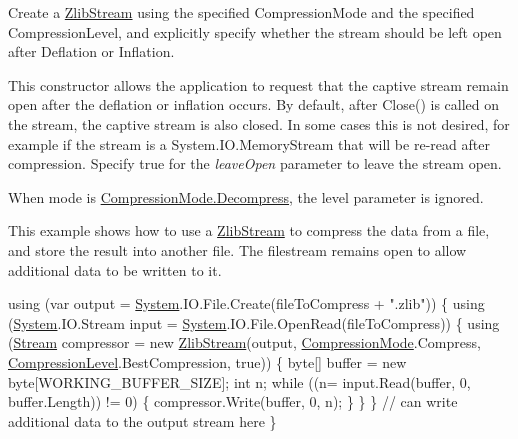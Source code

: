 Create a {\ttfamily \mbox{\hyperlink{class_super_tiled2_unity_1_1_ionic_1_1_zlib_1_1_zlib_stream}{Zlib\+Stream}}} using the specified {\ttfamily Compression\+Mode} and the specified {\ttfamily Compression\+Level}, and explicitly specify whether the stream should be left open after Deflation or Inflation. 

This constructor allows the application to request that the captive stream remain open after the deflation or inflation occurs. By default, after {\ttfamily Close()} is called on the stream, the captive stream is also closed. In some cases this is not desired, for example if the stream is a System.\+I\+O.\+Memory\+Stream that will be re-\/read after compression. Specify true for the {\itshape leave\+Open}  parameter to leave the stream open. 

When mode is {\ttfamily \mbox{\hyperlink{namespace_super_tiled2_unity_1_1_ionic_1_1_zlib_ad5b7635d92497e1c905e5de82eb1c6b1a6d2861192fdf4370bcf95c099be0f2f0}{Compression\+Mode.\+Decompress}}}, the level parameter is ignored. 

This example shows how to use a \mbox{\hyperlink{class_super_tiled2_unity_1_1_ionic_1_1_zlib_1_1_zlib_stream}{Zlib\+Stream}} to compress the data from a file, and store the result into another file. The filestream remains open to allow additional data to be written to it.


\begin{DoxyCode}
\textcolor{keyword}{using} (var output = \mbox{\hyperlink{namespace_system}{System}}.IO.File.Create(fileToCompress + \textcolor{stringliteral}{".zlib"}))
\{
    \textcolor{keyword}{using} (\mbox{\hyperlink{namespace_system}{System}}.IO.Stream input = \mbox{\hyperlink{namespace_system}{System}}.IO.File.OpenRead(fileToCompress))
    \{
        \textcolor{keyword}{using} (\mbox{\hyperlink{namespace_super_tiled2_unity_1_1_ionic_1_1_zip_a9ced5352c56e7e0fceff15b534073c83aeae835e83c0494a376229f254f7d3392}{Stream}} compressor = \textcolor{keyword}{new} \mbox{\hyperlink{class_super_tiled2_unity_1_1_ionic_1_1_zlib_1_1_zlib_stream_a626c8b9a6ae8fffc521a24efc94f6f39}{ZlibStream}}(output, 
      \mbox{\hyperlink{namespace_super_tiled2_unity_1_1_ionic_1_1_zlib_ad5b7635d92497e1c905e5de82eb1c6b1}{CompressionMode}}.Compress, \mbox{\hyperlink{namespace_super_tiled2_unity_1_1_ionic_1_1_zlib_a20f6771804996c363f454ad9765cd7db}{CompressionLevel}}.BestCompression, \textcolor{keyword}{true}))
        \{
            byte[] buffer = \textcolor{keyword}{new} byte[WORKING\_BUFFER\_SIZE];
            \textcolor{keywordtype}{int} n;
            \textcolor{keywordflow}{while} ((n= input.Read(buffer, 0, buffer.Length)) != 0)
            \{
                compressor.Write(buffer, 0, n);
            \}
        \}
    \}
    \textcolor{comment}{// can write additional data to the output stream here}
\}
\end{DoxyCode}
 
